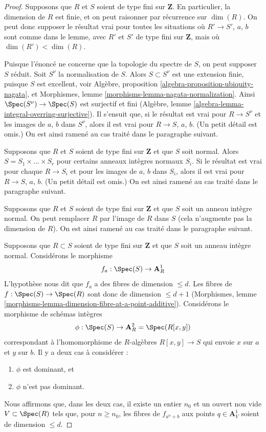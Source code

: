 \begin{proof}
\medskip\noindent
Supposons que $R$ et $S$ soient de type fini sur $\mathbf{Z}$. En particulier,
la dimension de $R$ est finie, et on peut raisonner par récurrence sur $\dim(R)$.
On peut donc supposer le résultat vrai pour toutes les situations où
$R' \to S'$, $a$, $b$ sont comme dans le lemme, avec $R'$ et $S'$ de type fini
sur $\mathbf{Z}$, mais où $\dim(R') < \dim(R)$.

\medskip\noindent
Puisque l'énoncé ne concerne que la topologie du spectre de $S$,
on peut supposer $S$ réduit. Soit $S^\nu$ la normalisation de $S$.
Alors $S \subset S^\nu$ est une extension finie, puisque $S$ est excellent, voir
Algèbre, proposition \ref{algebra-proposition-ubiquity-nagata},
et Morphismes, lemme \ref{morphisms-lemma-nagata-normalization}.
Ainsi $\Spec(S^\nu) \to \Spec(S)$ est surjectif et fini
(Algèbre, lemme \ref{algebra-lemma-integral-overring-surjective}).
Il s'ensuit que, si le résultat est vrai pour $R \to S^\nu$ et les
images de $a$, $b$ dans $S^\nu$, alors il est vrai pour $R \to S$, $a$, $b$.
(Un petit détail est omis.) On est ainsi ramené au cas traité dans le
paragraphe suivant.

\medskip\noindent
Supposons que $R$ et $S$ soient de type fini sur $\mathbf{Z}$ et que
$S$ soit normal. Alors $S = S_1 \times \ldots \times S_r$ pour certains
anneaux intègres normaux $S_i$. Si le résultat est vrai pour chaque $R \to S_i$
et pour les images de $a$, $b$ dans $S_i$, alors il est vrai pour
$R \to S$, $a$, $b$. (Un petit détail est omis.)
On est ainsi ramené au cas traité dans le paragraphe suivant.

\medskip\noindent
Supposons que $R$ et $S$ soient de type fini sur $\mathbf{Z}$ et que
$S$ soit un anneau intègre normal. On peut remplacer $R$ par l'image de $R$ dans $S$
(cela n'augmente pas la dimension de $R$).
On est ainsi ramené au cas traité dans le paragraphe suivant.

\medskip\noindent
Supposons que $R \subset S$ soient de type fini sur $\mathbf{Z}$ et que
$S$ soit un anneau intègre normal. Considérons le morphisme
$$
f_a : \Spec(S) \to \mathbf{A}^1_R
$$
L'hypothèse nous dit que $f_a$ a des fibres de dimension $\leq d$.
Les fibres de $f : \Spec(S) \to \Spec(R)$ sont donc de dimension $\leq d + 1$
(Morphismes, lemme \ref{morphisms-lemma-dimension-fibre-at-a-point-additive}).
Considérons le morphisme de schémas intègres
$$
\phi : \Spec(S) \to \mathbf{A}^2_R = \Spec(R[x, y])
$$
correspondant à l'homomorphisme de $R$-algèbres $R[x, y] \to S$ qui envoie $x$ sur $a$
et $y$ sur $b$. Il y a deux cas à considérer :
\begin{enumerate}
\item $\phi$ est dominant, et
\item $\phi$ n'est pas dominant.
\end{enumerate}
Nous affirmons que, dans les deux cas, il existe un entier $n_0$
et un ouvert non vide $V \subset \Spec(R)$ tels que, pour $n \geq n_0$,
les fibres de $f_{a^n + b}$ aux points $q \in \mathbf{A}^1_V$
soient de dimension $\leq d$.


\end{proof}
